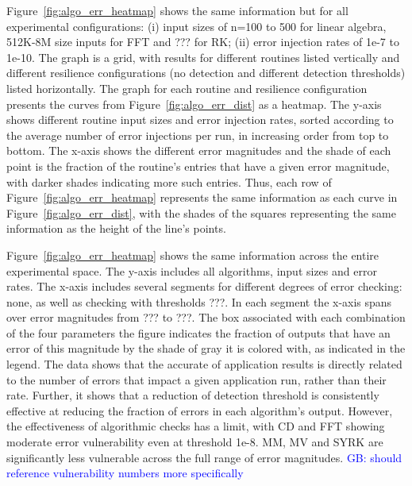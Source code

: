 \documentclass{sig-alternate}
\newcommand{\greg}[1]{%
  \textcolor{blue}{GB: #1}
}
\begin{document}
Figure~\ref{fig:algo_err_heatmap} shows the same information but for all experimental configurations: (i) input sizes of n=100 to 500 for linear algebra, 512K-8M size inputs for FFT and ??? for RK; (ii) error injection rates of 1e-7 to 1e-10.
The graph is a grid, with results for different routines listed vertically and different resilience configurations (no detection and different detection thresholds) listed horizontally.
The graph for each routine and resilience configuration presents the curves from Figure~\ref{fig:algo_err_dist} as a heatmap.
The y-axis shows different routine input sizes and error injection rates, sorted according to the average number of error injections per run, in increasing order from top to bottom.
The x-axis shows the different error magnitudes and the shade of each point is the fraction of the routine's entries that have a given error magnitude, with darker shades indicating more such entries.
Thus, each row of Figure~\ref{fig:algo_err_heatmap} represents the same information as each curve in Figure~\ref{fig:algo_err_dist}, with the shades of the squares representing the same information as the height of the line's points.

Figure~\ref{fig:algo_err_heatmap} shows the same information across the entire experimental space.
The y-axis includes all algorithms, input sizes and error rates.
The x-axis includes several segments for different degrees of error checking: none, as well as checking with thresholds ???. In each segment the x-axis spans over error magnitudes from ??? to ???.
The box associated with each combination of the four parameters the figure indicates the fraction of outputs that have an error of this magnitude by the shade of gray it is colored with, as indicated in the legend.
The data shows that the accurate of application results is directly related to the number of errors that impact a given application run, rather than their rate.
Further, it shows that a reduction of detection threshold is consistently effective at reducing the fraction of errors in each algorithm's output.
However, the effectiveness of algorithmic checks has a limit, with CD and FFT showing moderate error vulnerability even at threshold 1e-8.
MM, MV and SYRK are significantly less vulnerable across the full range of error magnitudes.
\greg{should reference vulnerability numbers more specifically}

\end{document}
